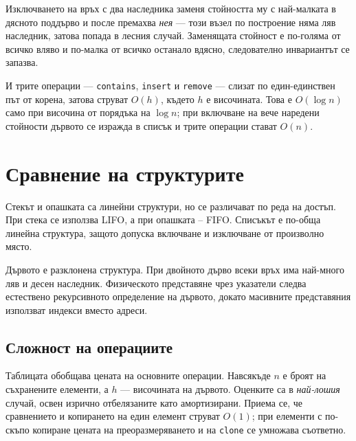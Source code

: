 Изключването на връх с два наследника заменя стойността му с най-малката в
дясното поддърво и после премахва \emph{нея} --- този възел по построение няма
ляв наследник, затова попада в лесния случай. Заменящата стойност е по-голяма от
всичко вляво и по-малка от всичко останало вдясно, следователно инвариантът се
запазва.

И трите операции --- \verb|contains|, \verb|insert| и \verb|remove| --- слизат
по един-единствен път от корена, затова струват $O(h)$, където $h$ е височината.
Това е $O(\log n)$ само при височина от порядъка на $\log n$; при включване на
вече наредени стойности дървото се изражда в списък и трите операции стават
$O(n)$.

\section{Сравнение на структурите}\label{s:18.8}

Стекът и опашката са линейни структури, но се различават по реда на достъп. При стека се използва LIFO, а при опашката -- FIFO. Списъкът е по-обща линейна структура, защото допуска включване и изключване от произволно място.

Дървото е разклонена структура. При двойното дърво всеки връх има най-много ляв и десен наследник. Физическото представяне чрез указатели следва естествено рекурсивното определение на дървото, докато масивните представяния използват индекси вместо адреси.

\subsection{Сложност на операциите}\label{s:18.8.1}

Таблицата обобщава цената на основните операции. Навсякъде $n$ е броят на
съхранените елементи, а $h$ --- височината на дървото. Оценките са в
\emph{най-лошия} случай, освен изрично отбелязаните като амортизирани. Приема се,
че сравнението и копирането на един елемент струват $O(1)$; при елементи с
по-скъпо копиране цената на преоразмеряването и на \verb|clone| се умножава
съответно.

